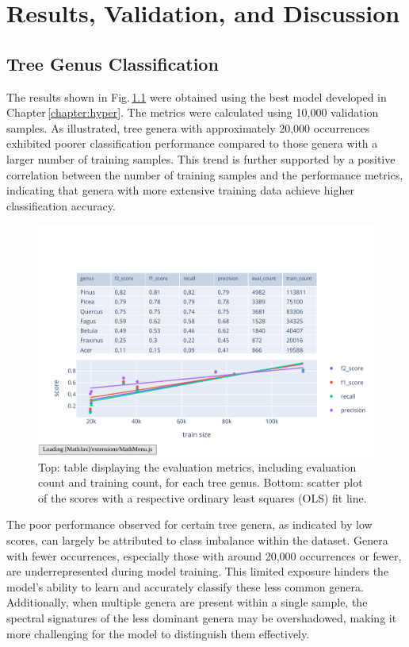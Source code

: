 \chapter{Results, Validation, and Discussion}
\label{chapter:results}

\section{Tree Genus Classification}

The results shown in Fig.\,\ref{fig:class_analysis} were obtained using the best model developed in Chapter\,\ref{chapter:hyper}. The metrics were calculated using 10,000 validation samples. As illustrated, tree genera with approximately 20,000 occurrences exhibited poorer classification performance compared to those genera with a larger number of training samples. This trend is further supported by a positive correlation between the number of training samples and the performance metrics, indicating that genera with more extensive training data achieve higher classification accuracy.

\begin{figure}[ht]
    \centering
    \includegraphics[width=0.98\linewidth, trim={10pt 20pt 10pt 40pt}, clip]{figures/figures_class/class_analysis.pdf}
    \caption{Top: table displaying the evaluation metrics, including evaluation count and training count, for each tree genus. Bottom: scatter plot of the scores with a respective ordinary least squares (OLS) fit line.}
    \label{fig:class_analysis}
\end{figure}

The poor performance observed for certain tree genera, as indicated by low scores, can largely be attributed to class imbalance within the dataset. Genera with fewer occurrences, especially those with around 20,000 occurrences or fewer, are underrepresented during model training. This limited exposure hinders the model's ability to learn and accurately classify these less common genera. Additionally, when multiple genera are present within a single sample, the spectral signatures of the less dominant genera may be overshadowed, making it more challenging for the model to distinguish them effectively.

